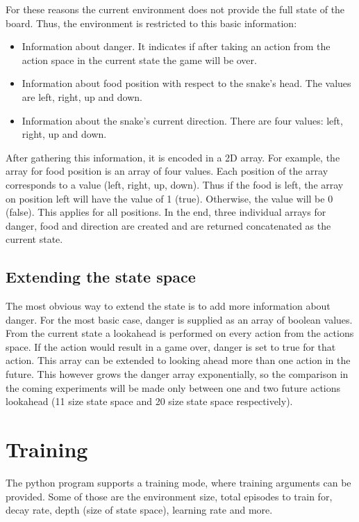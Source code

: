 \documentclass[lettersize,journal]{IEEEtran}
\begin{document}
For these reasons the current environment does not provide the full state of the board. Thus, the environment is restricted to
this basic information:
\begin{itemize}
    \item Information about danger. It indicates if after taking an action from the action space in the current state
        the game will be over.
    \item Information about food position with respect to the snake's head. The values are left, right, up and down.
    \item Information about the snake's current direction. There are four values: left, right, up and down.
\end{itemize}

After gathering this information, it is encoded in a 2D array. For example, the array for food position
is an array of four values. Each position of the array corresponds to a value (left, right, up, down).
Thus if the food is left, the array on position left will have the value of 1 (true). Otherwise, the
value will be 0 (false). This applies for all positions. In the end, three individual arrays for danger,
food and direction are created and are returned concatenated as the current state.


\subsection{Extending the state space}
The most obvious way to extend the state is to add more
information about danger. For the most basic case, danger
is supplied as an array of boolean values. From the current
state a lookahead is performed on every action from
the actions space. If the action would result in a game
over, danger is set to true for that action. This
array can be extended to looking ahead more than one action
in the future. This however grows the danger array
exponentially, so the comparison in the coming experiments
will be made only between one and two future actions lookahead
(11 size state space and 20 size state space respectively).


\section{Training} \label{training}
The python program supports a training mode, where
training arguments can be provided. Some of those are the environment size,
total episodes to train for, decay rate, depth (size of state space),
learning rate and more.
\end{document}
